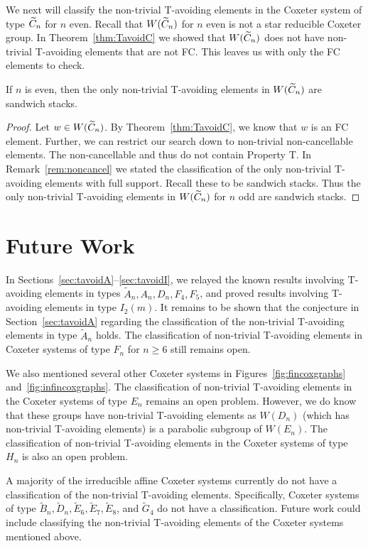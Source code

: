 We next will classify the non-trivial T-avoiding elements in the Coxeter system of type $\widetilde{C}_n$ for $n$ even. Recall that $W(\widetilde{C}_n)$ for $n$ even is not a star reducible Coxeter group. In Theorem~\ref{thm:TavoidC} we showed that $W(\widetilde{C}_n)$ does not have non-trivial T-avoiding elements that are not FC. This leaves us with only the FC elements to check.

\begin{theorem}
	If $n$ is even, then the only non-trivial T-avoiding elements in $W(\widetilde{C}_n)$ are sandwich stacks.
	\begin{proof}
		Let $w \in W(\widetilde{C}_n)$. By Theorem~\ref{thm:TavoidC}, we know that $w$ is an FC element. Further, we can restrict our search down to non-trivial non-cancellable elements. The non-cancellable  and thus do not contain Property T. In Remark~\ref{rem:noncancel} we stated the classification of the only non-trivial T-avoiding elements with full support. Recall these to be sandwich stacks. Thus the only non-trivial T-avoiding elements in $W(\widetilde{C}_n)$ for $n$ odd are sandwich stacks.
	\end{proof}
\end{theorem}


\section{Future Work}\label{sec:open}
In Sections~\ref{sec:tavoidA}--\ref{sec:tavoidI}, we relayed the known results involving T-avoiding elements in types $\widetilde{A}_n, A_n, D_n, F_4, F_5$, and proved results involving T-avoiding elements in type $I_2(m)$. It remains to be shown that the conjecture in Section~\ref{sec:tavoidA} regarding the classification of the non-trivial T-avoiding elements in type $\widetilde{A}_n$ holds. The classification of non-trivial T-avoiding elements in Coxeter systems of type $F_n$ for $n \geq 6$ still remains open.

We also mentioned several other Coxeter systems in Figures~\ref{fig:fincoxgraphs} and~\ref{fig:infincoxgraphs}. The classification of non-trivial T-avoiding elements in the Coxeter systems of type $E_n$ remains an open problem. However, we do know that these groups have non-trivial T-avoiding elements as $W(D_n)$ (which has non-trivial T-avoiding elements) is a parabolic subgroup of $W(E_n)$. The classification of non-trivial T-avoiding elements in the Coxeter systems of type $H_n$ is also an open problem. 

A majority of the irreducible affine Coxeter systems  currently do not have a classification of the non-trivial T-avoiding elements. Specifically, Coxeter systems of type $\widetilde{B}_n, \widetilde{D}_n, \widetilde{E}_6, \widetilde{E}_7, \widetilde{E}_8$, and $\widetilde{G}_4$ do not have a classification. Future work could include classifying the non-trivial T-avoiding elements of the Coxeter systems mentioned above.
